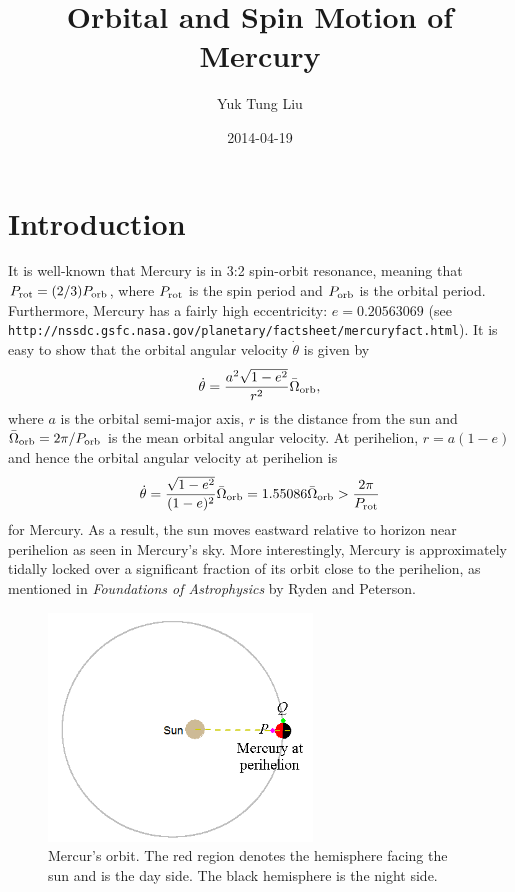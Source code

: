 \documentclass[12pt]{article}
\newcommand \beq {\begin{equation}}
\newcommand \eeq {\end{equation}}
\newcommand{\prot}{P_{\rm rot}}
\newcommand{\porb}{P_{\rm orb}}
\begin{document}
\title{Orbital and Spin Motion of Mercury}
\author{Yuk Tung Liu}
\date{2014-04-19}
\maketitle

\section{Introduction}

It is well-known that Mercury is in 3:2 spin-orbit resonance, meaning that
$\prot = (2/3) \porb$, where $\prot$ is the spin period and $\porb$ is the orbital period.
Furthermore, Mercury has a fairly high eccentricity: $e=0.20563069$ (see 
{\tt http://nssdc.gsfc.nasa.gov/planetary/factsheet/mercuryfact.html}). It is 
easy to show that the orbital angular velocity $\dot{\theta}$ is given by 
\[
  \dot{\theta} = \frac{a^2 \sqrt{1-e^2}}{r^2} \bar{\Omega}_{\rm orb} ,
\]
where $a$ is the orbital semi-major axis, $r$ is the distance from the sun 
and $\bar{\Omega}_{\rm orb}=2\pi/\porb$ is the mean orbital angular velocity. At perihelion, 
$r=a(1-e)$ and hence the orbital angular velocity at perihelion is 
\beq
  \dot{\theta} = \frac{\sqrt{1-e^2}}{(1-e)^2} \bar{\Omega}_{\rm orb} 
= 1.55086 \bar{\Omega}_{\rm orb} > \frac{2\pi}{\prot}
\eeq
for Mercury. As a result, the sun moves eastward relative to horizon near perihelion 
as seen in Mercury's sky. More interestingly, Mercury is approximately tidally locked 
over a significant fraction of its orbit close to the perihelion, as mentioned 
in {\it Foundations of Astrophysics} by Ryden and Peterson. 

\begin{figure}
\vskip -5mm
\includegraphics[width=7cm]{MercuryOrbit.png}
\caption{Mercur's orbit. The red region denotes the hemisphere facing the sun and 
is the day side. The black hemisphere is the night side.}
\label{fig:orbit}
\end{figure}
\end{document}
